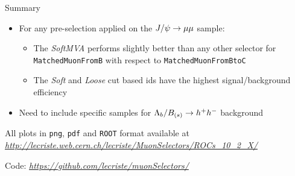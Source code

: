 \documentclass{beamer}
\begin{document}
\begin{frame}{Summary}
\begin{itemize}
    \item
    For any pre-selection applied on the $J/\psi \to \mu \mu$ sample:
    \begin{itemize}
        \item The \emph{SoftMVA} performs slightly better than any other selector for \texttt{MatchedMuonFromB} with respect to \texttt{MatchedMuonFromBtoC}

        \item The \emph{Soft} and \emph{Loose} cut based ids have the highest signal/background efficiency 
    \end{itemize}
    
    \item
    Need to include specific samples for $\Lambda_b/B_{(s)} \to h^+ h^-$ background     
\end{itemize}

\bigskip

All plots in \texttt{png}, \texttt{pdf} and \texttt{ROOT} format available at\\
\textit{\underline{http://lecriste.web.cern.ch/lecriste/MuonSelectors/ROCs\_10\_2\_X/}}

\medskip

Code:
\textit{\underline{https://github.com/lecriste/muonSelectors/}}    
\end{frame}

\begin{comment}
\begin{table}
\centering
\begin{tabular}{l|r}
Item & Quantity \\\hline
Widgets & 42 \\
Gadgets & 13
\end{tabular}
\caption{\label{tab:widgets}An example table.}
\end{table}
\end{comment}
\end{document}
